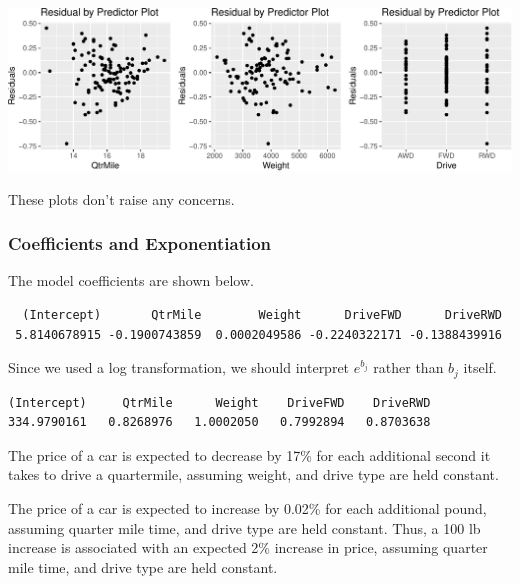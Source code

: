 \documentclass[
  letterpaper,
  DIV=11,
  numbers=noendperiod]{scrreprt}
\newenvironment{Shaded}{\begin{snugshade}}{\end{snugshade}}
\newcommand{\FunctionTok}[1]{\textcolor[rgb]{0.28,0.35,0.67}{#1}}
\newcommand{\NormalTok}[1]{\textcolor[rgb]{0.00,0.23,0.31}{#1}}
\newcommand{\SpecialCharTok}[1]{\textcolor[rgb]{0.37,0.37,0.37}{#1}}
\begin{document}
\includegraphics{Ch5_files/figure-pdf/unnamed-chunk-73-1.pdf}

These plots don't raise any concerns.

\subsubsection{Coefficients and
Exponentiation}\label{coefficients-and-exponentiation}

The model coefficients are shown below.

\begin{Shaded}
\end{Shaded}

\begin{verbatim}
  (Intercept)       QtrMile        Weight      DriveFWD      DriveRWD 
 5.8140678915 -0.1900743859  0.0002049586 -0.2240322171 -0.1388439916 
\end{verbatim}

Since we used a log transformation, we should interpret \(e^{b_j}\)
rather than \(b_j\) itself.

\begin{Shaded}
\end{Shaded}

\begin{verbatim}
(Intercept)     QtrMile      Weight    DriveFWD    DriveRWD 
334.9790161   0.8268976   1.0002050   0.7992894   0.8703638 
\end{verbatim}

The price of a car is expected to decrease by 17\% for each additional
second it takes to drive a quartermile, assuming weight, and drive type
are held constant.

The price of a car is expected to increase by 0.02\% for each additional
pound, assuming quarter mile time, and drive type are held constant.
Thus, a 100 lb increase is associated with an expected 2\% increase in
price, assuming quarter mile time, and drive type are held constant.
\end{document}
